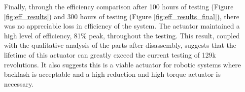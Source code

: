 Finally, through the efficiency comparison after 100 hours of testing (Figure \ref{fig:eff_results}) and 300 hours of testing (Figure \ref{fig:eff_results_final}), there was no appreciable loss in efficiency of the system. The actuator maintained a high level of efficiency, 81\% peak, throughout the testing. This result, coupled with the qualitative analysis of the parts after disassembly, suggests that the lifetime of this actuator can greatly exceed the current testing of 129k revolutions. It also suggests this is a viable actuator for robotic systems where backlash is acceptable and a high reduction and high torque actuator is necessary. 


